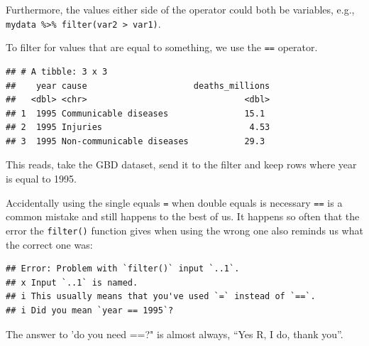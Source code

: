 \documentclass[
  12pt,
  krantz2]{krantz}
\makeatletter
\newenvironment{Shaded}{\begin{snugshade}}{\end{snugshade}}
\newcommand{\DataTypeTok}[1]{\textcolor[rgb]{0.13,0.29,0.53}{#1}}
\newcommand{\DecValTok}[1]{\textcolor[rgb]{0.00,0.00,0.81}{#1}}
\newcommand{\KeywordTok}[1]{\textcolor[rgb]{0.13,0.29,0.53}{\textbf{#1}}}
\newcommand{\NormalTok}[1]{#1}
\newcommand{\OperatorTok}[1]{\textcolor[rgb]{0.81,0.36,0.00}{\textbf{#1}}}
\newcommand{\StringTok}[1]{\textcolor[rgb]{0.31,0.60,0.02}{#1}}
\renewenvironment{quote}{\begin{VF}}{\end{VF}}
\newenvironment{kframe}{%
\medskip{}
\setlength{\fboxsep}{.8em}
 \def\at@end@of@kframe{}%
 \ifinner\ifhmode%
  \def\at@end@of@kframe{\end{minipage}}%
  \begin{minipage}{\columnwidth}%
 \fi\fi%
 \def\FrameCommand##1{\hskip\@totalleftmargin \hskip-\fboxsep
 \colorbox{shadecolor}{##1}\hskip-\fboxsep
     \hskip-\linewidth \hskip-\@totalleftmargin \hskip\columnwidth}%
 \MakeFramed {\advance\hsize-\width
   \@totalleftmargin\z@ \linewidth\hsize
   \@setminipage}}%
 {\par\unskip\endMakeFramed%
 \at@end@of@kframe}
\renewenvironment{Shaded}{\begin{kframe}}{\end{kframe}}
\makeatother
\begin{document}
Furthermore, the values either side of the operator could both be variables, e.g., \texttt{mydata\ \%\textgreater{}\%\ filter(var2\ \textgreater{}\ var1)}.

To filter for values that are equal to something, we use the \texttt{==} operator.

\begin{Shaded}
\end{Shaded}

\begin{verbatim}
## # A tibble: 3 x 3
##    year cause                     deaths_millions
##   <dbl> <chr>                               <dbl>
## 1  1995 Communicable diseases               15.1 
## 2  1995 Injuries                             4.53
## 3  1995 Non-communicable diseases           29.3
\end{verbatim}

This reads, take the GBD dataset, send it to the filter and keep rows where year is equal to 1995.

Accidentally using the single equals \texttt{=} when double equals is necessary \texttt{==} is a common mistake and still happens to the best of us.
It happens so often that the error the \texttt{filter()} function gives when using the wrong one also reminds us what the correct one was:

\begin{Shaded}
\end{Shaded}

\begin{verbatim}
## Error: Problem with `filter()` input `..1`.
## x Input `..1` is named.
## i This usually means that you've used `=` instead of `==`.
## i Did you mean `year == 1995`?
\end{verbatim}

\begin{quote}
The answer to 'do you need ==?" is almost always, ``Yes R, I do, thank you''.
\end{quote}
\end{document}
